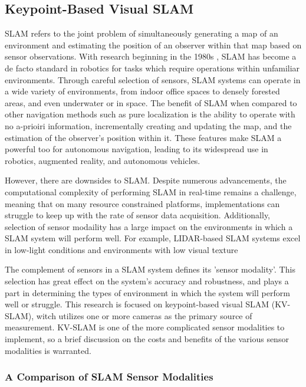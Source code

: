 \subsection{Keypoint-Based Visual SLAM}

SLAM refers to the joint problem of simultaneously generating a map of an environment and estimating the position of an observer within that map based on sensor observations. With research beginning in the 1980s \cite{smithEstimatingUncertainSpatial1988}, SLAM has become a de facto standard in robotics for tasks which require operations within unfamiliar environments. Through careful selection of sensors, SLAM systems can operate in a wide variety of environments, from indoor office spaces to densely forested areas, and even underwater or in space. The benefit of SLAM when compared to other navigation methods such as pure localization is the ability to operate with no a-prioiri information, incrementally creating and updating the map, and the estimation of the observer's position within it. These features make SLAM a powerful too for autonomous navigation, leading to its widespread use in robotics, augmented reality, and autonomous vehicles.

% 
However, there are downsides to SLAM. Despite numerous advancements, the computational complexity of performing SLAM in real-time remains a challenge, meaning that on many resource constrained platforms, implementations can struggle to keep up with the rate of sensor data acquisition. Additionally, selection of sensor modaility has a large impact on the environments in which a SLAM system will perform well. For example, LIDAR-based SLAM systems excel in low-light conditions and environments with low visual texture

The complement of sensors in a SLAM system defines its 'sensor modality'. This selection has great effect on the system's accuracy and robustness, and plays a part in determining the types of environment in which the system will perform well or struggle. This research is focused on keypoint-based visual SLAM (KV-SLAM), witch utilizes one or more cameras as the primary source of measurement. KV-SLAM is one of the more complicated sensor modalities to implement, so a brief discussion on the costs and benefits of the various sensor modalities is warranted.

\subsubsection{A Comparison of SLAM Sensor Modalities}

